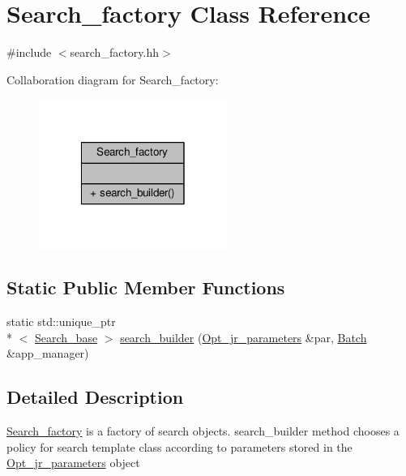 \hypertarget{classSearch__factory}{\section{Search\-\_\-factory Class Reference}
\label{classSearch__factory}
}


{\ttfamily \#include $<$search\-\_\-factory.\-hh$>$}



Collaboration diagram for Search\-\_\-factory\-:\nopagebreak
\begin{figure}[H]
\begin{center}
\leavevmode
\includegraphics[width=174pt]{classSearch__factory__coll__graph}
\end{center}
\end{figure}
\subsection*{Static Public Member Functions}
\begin{DoxyCompactItemize}
\item 
static std\-::unique\-\_\-ptr\\*
$<$ \hyperlink{classSearch__base}{Search\-\_\-base} $>$ \hyperlink{classSearch__factory_a56cf434e80721adb9faf8d064a98adee}{search\-\_\-builder} (\hyperlink{classOpt__jr__parameters}{Opt\-\_\-jr\-\_\-parameters} \&par, \hyperlink{classBatch}{Batch} \&app\-\_\-manager)
\end{DoxyCompactItemize}


\subsection{Detailed Description}
\hyperlink{classSearch__factory}{Search\-\_\-factory} is a factory of search objects. search\-\_\-builder method chooses a policy for search template class according to parameters stored in the \hyperlink{classOpt__jr__parameters}{Opt\-\_\-jr\-\_\-parameters} object 

